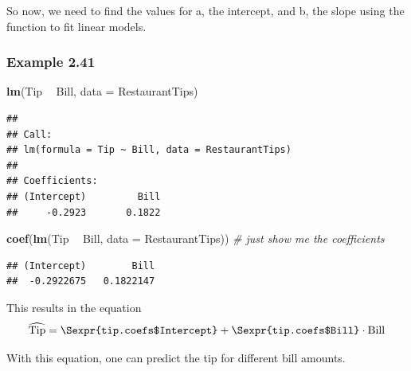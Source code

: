 \documentclass[]{book}
\newenvironment{Shaded}{\begin{snugshade}}{\end{snugshade}}
\newcommand{\CommentTok}[1]{\textcolor[rgb]{0.56,0.35,0.01}{\textit{#1}}}
\newcommand{\DataTypeTok}[1]{\textcolor[rgb]{0.13,0.29,0.53}{#1}}
\newcommand{\FloatTok}[1]{\textcolor[rgb]{0.00,0.00,0.81}{#1}}
\newcommand{\KeywordTok}[1]{\textcolor[rgb]{0.13,0.29,0.53}{\textbf{#1}}}
\newcommand{\NormalTok}[1]{#1}
\newcommand{\OperatorTok}[1]{\textcolor[rgb]{0.81,0.36,0.00}{\textbf{#1}}}
\newcommand{\StringTok}[1]{\textcolor[rgb]{0.31,0.60,0.02}{#1}}
\begin{document}
So now, we need to find the values for a, the intercept, and b, the slope using the function to fit linear models.

\hypertarget{example-2.41}{%
\subsubsection{Example 2.41}\label{example-2.41}}

\begin{Shaded}
\begin{Highlighting}[]
\KeywordTok{lm}\NormalTok{(Tip }\OperatorTok{~}\StringTok{ }\NormalTok{Bill, }\DataTypeTok{data =}\NormalTok{ RestaurantTips)}
\end{Highlighting}
\end{Shaded}

\begin{verbatim}
## 
## Call:
## lm(formula = Tip ~ Bill, data = RestaurantTips)
## 
## Coefficients:
## (Intercept)         Bill  
##     -0.2923       0.1822
\end{verbatim}

\begin{Shaded}
\begin{Highlighting}[]
\KeywordTok{coef}\NormalTok{(}\KeywordTok{lm}\NormalTok{(Tip }\OperatorTok{~}\StringTok{ }\NormalTok{Bill, }\DataTypeTok{data =}\NormalTok{ RestaurantTips))  }\CommentTok{# just show me the coefficients}
\end{Highlighting}
\end{Shaded}

\begin{verbatim}
## (Intercept)        Bill 
##  -0.2922675   0.1822147
\end{verbatim}

This results in the equation
\[
\widehat{\mbox{Tip}} = \Sexpr{tip.coefs$Intercept} + \Sexpr{tip.coefs$Bill} \cdot \mbox{Bill}
\]

With this equation, one can predict the tip for different bill amounts.

\begin{Shaded}
\end{Shaded}
\end{document}
